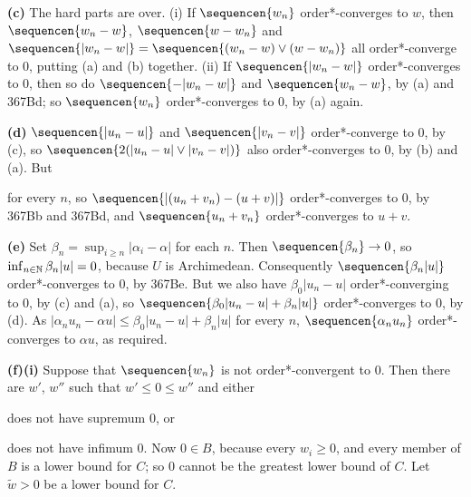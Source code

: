 {{\bf (c)} The hard parts are over.   (i) If $\sequencen{w_n}$
order*-converges to $w$, then $\sequencen{w_n-w}$,
$\sequencen{w-w_n}$ and
$\sequencen{|w_n-w|}
=\sequencen{(w_n-w)\vee(w-w_n)}$ all order*-converge to $0$, putting
(a) and (b) together.   (ii) If $\sequencen{|w_n-w|}$
order*-converges to $0$, then so do $\sequencen{-|w_n-w|}$ and
$\sequencen{w_n-w}$, by (a) and 367Bd;  so $\sequencen{w_n}$
order*-converges to $0$, by (a) again.
     
\medskip
     
{\bf (d)} $\sequencen{|u_n-u|}$ and $\sequencen{|v_n-v|}$
order*-converge to $0$, by (c), so
$\sequencen{2(|u_n-u|\vee|v_n-v|)}$ also order*-converges to $0$, by
(b) and (a).   But
     
     
\noindent for every $n$, so $\sequencen{|(u_n+v_n)-(u+v)|}$
order*-converges to $0$, by 367Bb and 367Bd, and
$\sequencen{u_n+v_n}$ order*-converges to $u+v$.
     
\medskip
     
{\bf (e)} Set $\beta_n=\sup_{i\ge n}|\alpha_i-\alpha|$ for each $n$.
Then $\sequencen{\beta_n}\to 0$, so $\inf_{n\in\Bbb N}\beta_n|u|=0$,
because $U$ is Archimedean.   Consequently $\sequencen{\beta_n|u|}$
order*-converges to $0$, by 367Be.   But we also have
$\beta_0|u_n-u|$ order*-converging to $0$, by (c) and (a), so
$\sequencen{\beta_0|u_n-u|+\beta_n|u|}$ order*-converges to $0$, by
(d).   As $|\alpha_nu_n-\alpha u|\le\beta_0|u_n-u|+\beta_n|u|$ for every
$n$, $\sequencen{\alpha_nu_n}$ order*-converges to $\alpha u$, as
required.
     
\medskip
     
{\bf (f)(i)} Suppose that $\sequencen{w_n}$ is not order*-convergent
to $0$.   Then there are $w'$, $w''$ such that $w'\le 0\le w''$ and
either
     
     
\noindent does not have supremum $0$, or
     
     
\noindent does not have infimum $0$.   Now $0\in B$, because every
$w_i\ge 0$, and every member of $B$ is a lower bound for $C$;  so $0$
cannot be the greatest lower bound of $C$.   Let $\tilde w>0$ be a lower
bound for $C$.
     
}
